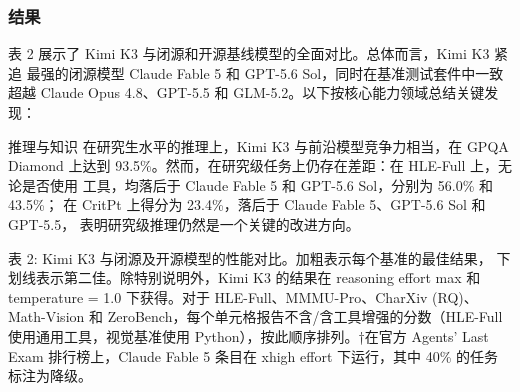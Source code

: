 \documentclass[
  10
]{article}
\begin{document}
\subsubsection{结果}\label{results}

表 2 展示了 Kimi K3 与闭源和开源基线模型的全面对比。总体而言，Kimi K3 紧追
最强的闭源模型 Claude Fable 5 和 GPT-5.6 Sol，同时在基准测试套件中一致
超越 Claude Opus 4.8、GPT-5.5 和 GLM-5.2。以下按核心能力领域总结关键发现：

推理与知识 在研究生水平的推理上，Kimi K3 与前沿模型竞争力相当，在 GPQA Diamond
上达到 93.5\%。然而，在研究级任务上仍存在差距：在 HLE-Full 上，无论是否使用
工具，均落后于 Claude Fable 5 和 GPT-5.6 Sol，分别为 56.0\% 和 43.5\%；
在 CritPt 上得分为 23.4\%，落后于 Claude Fable 5、GPT-5.6 Sol 和 GPT-5.5，
表明研究级推理仍然是一个关键的改进方向。

表 2: Kimi K3 与闭源及开源模型的性能对比。加粗表示每个基准的最佳结果，
下划线表示第二佳。除特别说明外，Kimi K3 的结果在 reasoning effort max
和 temperature = 1.0 下获得。对于 HLE-Full、MMMU-Pro、CharXiv (RQ)、
Math-Vision 和 ZeroBench，每个单元格报告不含/含工具增强的分数（HLE-Full
使用通用工具，视觉基准使用 Python），按此顺序排列。†在官方 Agents' Last Exam
排行榜上，Claude Fable 5 条目在 xhigh effort 下运行，其中 40\% 的任务标注为降级。
\end{document}
